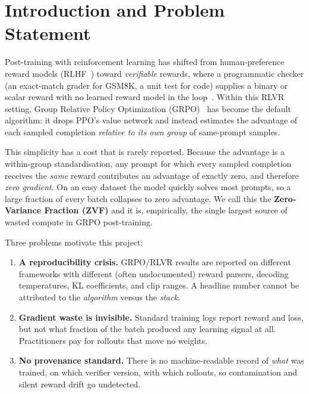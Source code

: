\documentclass[11pt,a4paper]{article}
\begin{document}
\section{Introduction and Problem Statement}
\label{sec:intro}

Post-training with reinforcement learning has shifted from human-preference
reward models (RLHF~\cite{ouyang2022instructgpt}) toward \emph{verifiable}
rewards, where a programmatic checker (an exact-match grader for GSM8K, a unit
test for code) supplies a binary or scalar reward with no learned reward model in
the loop~\cite{lambert2024tulu3,guo2025r1}. Within this RLVR setting, Group
Relative Policy Optimization (GRPO)~\cite{shao2024deepseekmath} has become the
default algorithm: it drops PPO's value network and instead estimates the
advantage of each sampled completion \emph{relative to its own group} of
same-prompt samples.

This simplicity has a cost that is rarely reported. Because the advantage is a
within-group standardisation, any prompt for which every sampled completion
receives the \emph{same} reward contributes an advantage of exactly zero, and
therefore \emph{zero gradient}. On an easy dataset the model quickly solves most
prompts, so a large fraction of every batch collapses to zero advantage. We call
this the \textbf{Zero-Variance Fraction (ZVF)} and it is, empirically, the
single largest source of wasted compute in GRPO post-training.

Three problems motivate this project:

\begin{enumerate}[leftmargin=1.4em,itemsep=2pt]
  \item \textbf{A reproducibility crisis.} GRPO/RLVR results are reported on
  different frameworks with different (often undocumented) reward parsers,
  decoding temperatures, KL coefficients, and clip ranges. A headline number
  cannot be attributed to the \emph{algorithm} versus the \emph{stack}.
  \item \textbf{Gradient waste is invisible.} Standard training logs report reward
  and loss, but not what fraction of the batch produced any learning signal at
  all. Practitioners pay for rollouts that move no weights.
  \item \textbf{No provenance standard.} There is no machine-readable record of
  \emph{what} was trained, on which verifier version, with which rollouts, so
  contamination and silent reward drift go undetected.
\end{enumerate}
\end{document}
